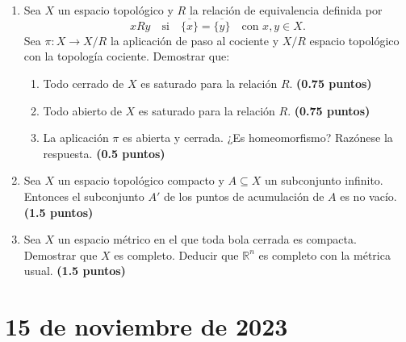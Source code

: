 \begin{enumerate}
    \item Sea $X$ un espacio topológico y $R$ la relación de equivalencia definida por
    \[
        x Ry \quad \text{si} \quad \overline{\{x\}} = \overline{\{y\}} \quad \text{con } x, y \in X.
    \]
    Sea $\pi : X \to X/R$ la aplicación de paso al cociente y $X/R$ espacio topológico con la topología cociente. Demostrar que:
    \begin{enumerate}
        \item Todo cerrado de $X$ es saturado para la relación $R$.
        \hfill \textbf{(0.75 puntos)}
        \item Todo abierto de $X$ es saturado para la relación $R$.
        \hfill \textbf{(0.75 puntos)}
        \item La aplicación $\pi$ es abierta y cerrada. ¿Es homeomorfismo? Razónese la respuesta.
        \hfill \textbf{(0.5 puntos)}
    \end{enumerate}

    \item Sea $X$ un espacio topológico compacto y $A \subseteq X$ un subconjunto infinito. Entonces el subconjunto $A'$ de los puntos de acumulación de $A$ es no vacío.
    \hfill \textbf{(1.5 puntos)}

    \item Sea $X$ un espacio métrico en el que toda bola cerrada es compacta. Demostrar que $X$ es completo. Deducir que $\mathbb{R}^n$ es completo con la métrica usual.
    \hfill \textbf{(1.5 puntos)}
\end{enumerate}

\newpage

\section{15 de noviembre de 2023}

